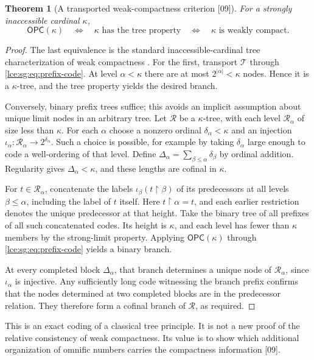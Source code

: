\documentclass[11pt,letterpaper]{article}
\numberwithin{equation}{section}
\newtheorem{theorem}{Theorem}[section]
\theoremstyle{definition}
\theoremstyle{remark}
\newcommand{\abs}[1]{\lvert#1\rvert}
\newcommand{\res}{\mathbin{\upharpoonright}}
\newcommand{\src}[1]{\textup{\textsf{\small[#1]}}}%
\newcommand{\OPC}{\mathsf{OPC}}
\begin{document}
\begin{theorem}[A transported weak-compactness criterion \src{09}]\label{lce:sg:thm:weak}
For a strongly inaccessible cardinal $\kappa$,
\[
 \OPC(\kappa)
 \quad\Longleftrightarrow\quad
 \kappa\text{ has the tree property}
 \quad\Longleftrightarrow\quad
 \kappa\text{ is weakly compact}.
\]
\end{theorem}
\begin{proof}
The last equivalence is the standard inaccessible-cardinal tree
characterization of weak compactness \cite{Kanamori}. For the first,
transport $\mathcal T$ through \eqref{lce:sg:eq:prefix-code}. At level
$\alpha<\kappa$ there are at most $2^{\abs\alpha}<\kappa$ nodes. Hence it is
a $\kappa$-tree, and the tree property yields the desired branch.

Conversely, binary prefix trees suffice; this avoids an implicit
assumption about unique limit nodes in an arbitrary tree. Let $\mathcal R$
be a $\kappa$-tree, with each level $\mathcal R_\alpha$ of size less than
$\kappa$. For each $\alpha$ choose a nonzero ordinal $\delta_\alpha<\kappa$
and an injection $\iota_\alpha:\mathcal R_\alpha\to2^{\delta_\alpha}$. Such
a choice is possible, for example by taking $\delta_\alpha$ large enough to
code a well-ordering of that level. Define
$\Delta_\alpha=\sum_{\beta\le\alpha}\delta_\beta$ by ordinal addition.
Regularity gives $\Delta_\alpha<\kappa$, and these lengths are cofinal in
$\kappa$.

For $t\in\mathcal R_\alpha$, concatenate the labels
$\iota_\beta(t\res\beta)$ of its predecessors at all levels $\beta\le\alpha$,
including the label of $t$ itself. Here $t\res\alpha=t$, and each earlier
restriction denotes the unique predecessor at that height. Take the binary
tree of all prefixes of all such concatenated codes. Its height is
$\kappa$, and each level has fewer than $\kappa$ members by the strong-limit
property. Applying $\OPC(\kappa)$ through \eqref{lce:sg:eq:prefix-code}
yields a binary branch.

At every completed block $\Delta_\alpha$, that branch determines a unique
node of $\mathcal R_\alpha$, since $\iota_\alpha$ is injective. Any
sufficiently long code witnessing the branch prefix confirms that the nodes
determined at two completed blocks are in the predecessor relation. They
therefore form a cofinal branch of $\mathcal R$, as required.
\end{proof}
This is an exact coding of a classical tree principle. It is not a new
proof of the relative consistency of weak compactness. Its value is to show
which additional organization of omnific numbers carries the compactness
information \src{09}.
\end{document}
